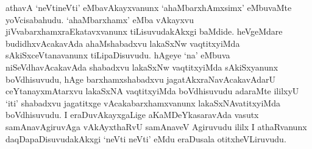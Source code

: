 \begin{artha}
athavA `neVtineVti' eMbavAkayxvanunx `ahaMbarxhAmxsimx' eMbuvaMte
yoVcisa\-bahudu.  `ahaMbarxhamx' eMba vAkayxvu
jiVvabarxhamxraEkatavxvanunx tiLisuvudakAkxgi \-baMdide. heVgeMdare
budidhxvAcakavAda ahaMshabadxvu lakaSxNw vaqtitxyiMda
sAkiSxceVtanavanunx tiLipaDisuvudu. hAgeye `na' eMbuva
niSeVdhavAcakavAda shabadxvu lakaSxNw vaqtitxyiMda sAkiSxyanunx
boVdhisuvudu, hAge barxhamxshabadxvu jagatAkxraNavAcakavAdarU
ceYtanayxmAtarxvu lakaSxNA vaqtitxyiMda boVdhisuvudu adaraMte ililxyU
`iti' shabadxvu jagatitxge vAcakabarxhamxvanunx lakaSxNAvatitxyiMda
boVdhisuvudu. I eraDuvAkayxgaLige aKaMDeYkasaravAda vasutx
samAnavAgiruvAga vAkAyxthaRvU samAnaveV \-Agiruvudu ililx I athaRvanunx
daqDapaDisuvudakAkxgi `neVti neVti' eMdu eraDusala otitxheVLiruvudu.
\end{artha}

\centerline{}

